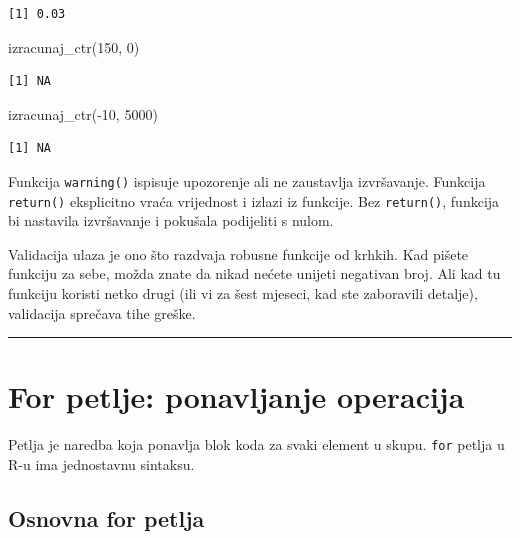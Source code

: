\documentclass[
  croatian,
  letterpaper,
  DIV=11,
  numbers=noendperiod]{scrartcl}
\newenvironment{Shaded}{\begin{snugshade}}{\end{snugshade}}
\newcommand{\DecValTok}[1]{\textcolor[rgb]{0.68,0.00,0.00}{#1}}
\newcommand{\FunctionTok}[1]{\textcolor[rgb]{0.28,0.35,0.67}{#1}}
\newcommand{\NormalTok}[1]{\textcolor[rgb]{0.00,0.23,0.31}{#1}}
\newcommand{\SpecialCharTok}[1]{\textcolor[rgb]{0.37,0.37,0.37}{#1}}
\begin{document}
\begin{verbatim}
[1] 0.03
\end{verbatim}

\begin{Shaded}
\begin{Highlighting}[]
\FunctionTok{izracunaj\_ctr}\NormalTok{(}\DecValTok{150}\NormalTok{, }\DecValTok{0}\NormalTok{)}
\end{Highlighting}
\end{Shaded}

\begin{verbatim}
[1] NA
\end{verbatim}

\begin{Shaded}
\begin{Highlighting}[]
\FunctionTok{izracunaj\_ctr}\NormalTok{(}\SpecialCharTok{{-}}\DecValTok{10}\NormalTok{, }\DecValTok{5000}\NormalTok{)}
\end{Highlighting}
\end{Shaded}

\begin{verbatim}
[1] NA
\end{verbatim}

Funkcija \texttt{warning()} ispisuje upozorenje ali ne zaustavlja
izvršavanje. Funkcija \texttt{return()} eksplicitno vraća vrijednost i
izlazi iz funkcije. Bez \texttt{return()}, funkcija bi nastavila
izvršavanje i pokušala podijeliti s nulom.

Validacija ulaza je ono što razdvaja robusne funkcije od krhkih. Kad
pišete funkciju za sebe, možda znate da nikad nećete unijeti negativan
broj. Ali kad tu funkciju koristi netko drugi (ili vi za šest mjeseci,
kad ste zaboravili detalje), validacija sprečava tihe greške.

\begin{center}\rule{0.5\linewidth}{0.5pt}\end{center}

\section{For petlje: ponavljanje operacija}\label{sec-for}

Petlja je naredba koja ponavlja blok koda za svaki element u skupu.
\texttt{for} petlja u R-u ima jednostavnu sintaksu.

\subsection{Osnovna for petlja}\label{osnovna-for-petlja}
\end{document}

